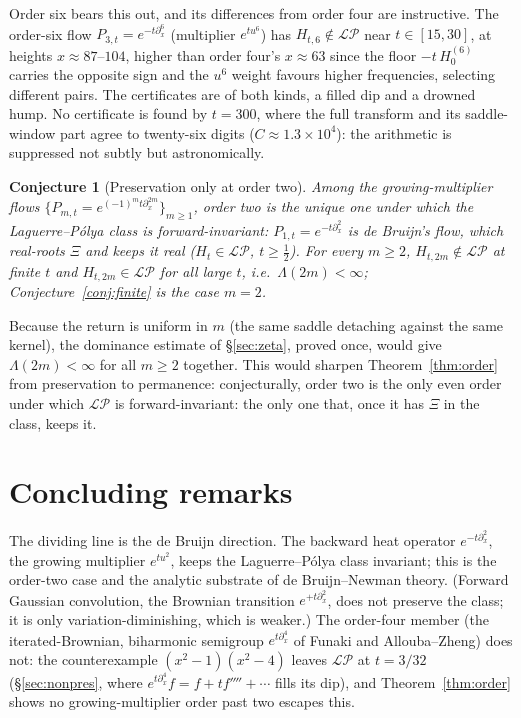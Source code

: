 \documentclass[11pt,reqno]{amsart}
\theoremstyle{plain}
\newtheorem{conjecture}[theorem]{Conjecture}
\theoremstyle{definition}
\theoremstyle{remark}
\newcommand{\LP}{\mathcal{LP}}
\begin{document}
Order six bears this out, and its differences from order four are instructive. The order-six flow $P_{3,t}=e^{-t\partial_x^6}$ (multiplier $e^{tu^6}$)
has $H_{t,6}\notin\LP$ near $t\in[15,30]$, at heights $x\approx87$--$104$,
higher than order four's $x\approx63$ since the floor $-t\,H_0^{(6)}$ carries the
opposite sign and the $u^6$ weight favours higher frequencies, selecting
different pairs. The certificates are of both kinds, a filled dip and a drowned
hump. No certificate is found by $t=300$, where the full transform and its
saddle-window part agree to twenty-six digits ($C\approx1.3\times10^4$): the
arithmetic is suppressed not subtly but astronomically.

\begin{conjecture}[Preservation only at order two]\label{conj:monotone}
Among the growing-multiplier flows $\{P_{m,t}=e^{(-1)^m t\partial_x^{2m}}\}_{m\ge1}$,
order two is the unique one under which the Laguerre--P\'olya class is
forward-invariant: $P_{1,t}=e^{-t\partial_x^2}$ is de Bruijn's flow, which
real-roots $\Xi$ and keeps it real ($H_t\in\LP$, $t\ge\tfrac12$). For every
$m\ge2$, $H_{t,2m}\notin\LP$ at finite $t$ and $H_{t,2m}\in\LP$ for all large
$t$, i.e.\ $\Lambda(2m)<\infty$; Conjecture~\ref{conj:finite} is the case $m=2$.
\end{conjecture}

Because the return is uniform in $m$ (the same saddle detaching
against the same kernel), the dominance estimate of \S\ref{sec:zeta}, proved
once, would give $\Lambda(2m)<\infty$ for all $m\ge2$ together. This would sharpen
Theorem~\ref{thm:order} from preservation to permanence:
conjecturally, order two is the only even order under which $\LP$ is
forward-invariant: the only one that, once it has $\Xi$ in the class, keeps it.

\section{Concluding remarks}\label{sec:concl}

The dividing line is the de Bruijn direction.
The backward heat operator $e^{-t\partial_x^2}$, the growing multiplier
$e^{tu^2}$, keeps the Laguerre--P\'olya class invariant; this is the order-two
case and the analytic substrate of de Bruijn--Newman theory. (Forward Gaussian
convolution, the Brownian transition $e^{+t\partial_x^2}$, does not
preserve the class; it is only variation-diminishing, which is weaker.) The
order-four member (the iterated-Brownian, biharmonic semigroup
$e^{t\partial_x^4}$ of Funaki and Allouba--Zheng) does not: the counterexample
$(x^2-1)(x^2-4)$ leaves $\LP$ at $t=3/32$ (\S\ref{sec:nonpres}, where
$e^{t\partial_x^4}f=f+tf''''+\cdots$ fills its dip), and Theorem~\ref{thm:order}
shows no growing-multiplier order past two escapes this.
\end{document}

